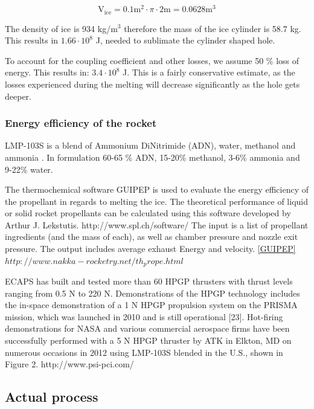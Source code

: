 \begin{equation}
\mathrm{V_{ice}}=0.1 \mathrm{m}^2 \cdot \pi \cdot 2 \mathrm{m} = 0.0628 \mathrm{m}^3
\end{equation}

The density of ice is 934 kg/m$^3$ therefore the mass of the ice cylinder is 58.7 kg. This results in $1.66\cdot 10^8$ J, needed to sublimate the cylinder shaped hole. 

To account for the coupling coefficient and other losses, we assume 50 \% loss of energy. This results in: $3.4 \cdot 10^8$ J. This is a fairly conservative estimate, as the losses experienced during the melting will decrease significantly as the hole gets deeper. 




\subsubsection{Energy efficiency of the rocket}

LMP-103S is a blend of Ammonium DiNitrimide (ADN), water, methanol and ammonia \cite{Walter_2014}. In formulation 60-65 \% ADN, 15-20\% methanol, 3-6\% ammonia and 9-22\% water. \cite{Taylor_2013}



The thermochemical software GUIPEP is used to evaluate the energy efficiency of the propellant in regards to melting the ice. The theoretical performance of liquid or solid rocket propellants can be calculated using this software developed by Arthur J. Lekstutis. http://www.spl.ch/software/ The input is a list of propellant ingredients (and the mass of each), as well as chamber pressure and nozzle exit pressure. The output includes average exhaust Energy and velocity. \ref{GUIPEP} $http://www.nakka-rocketry.net/th_prope.html$

ECAPS has built and tested more than 60 HPGP thrusters with thrust levels ranging from 0.5 N to 220 N.
Demonstrations of the HPGP technology includes the in-space demonstration of a 1 N HPGP propulsion system on
the PRISMA mission, which was launched in 2010 and is still operational [23]. Hot-firing demonstrations for
NASA and various commercial aerospace firms have been successfully performed with a 5 N HPGP thruster by
ATK in Elkton, MD on numerous occasions in 2012 using LMP-103S blended in the U.S., shown in Figure 2. http://www.psi-pci.com/
\subsection{Actual process}

